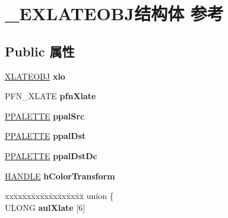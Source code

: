 \hypertarget{struct___e_x_l_a_t_e_o_b_j}{}\section{\+\_\+\+E\+X\+L\+A\+T\+E\+O\+B\+J结构体 参考}
\label{struct___e_x_l_a_t_e_o_b_j}
\subsection*{Public 属性}
\begin{DoxyCompactItemize}
\item 
\mbox{\label{struct___e_x_l_a_t_e_o_b_j_a0fdcb7720264e79ed574e84343294c29}} 
\hyperlink{struct___x_l_a_t_e_o_b_j}{X\+L\+A\+T\+E\+O\+BJ} {\bfseries xlo}
\item 
\mbox{\label{struct___e_x_l_a_t_e_o_b_j_a856ff64dacd2362e0ec90270f9d7d4a5}} 
P\+F\+N\+\_\+\+X\+L\+A\+TE {\bfseries pfn\+Xlate}
\item 
\mbox{\label{struct___e_x_l_a_t_e_o_b_j_a44d73539b3b0b87d65de88504a63ec1f}} 
\hyperlink{struct___p_a_l_e_t_t_e}{P\+P\+A\+L\+E\+T\+TE} {\bfseries ppal\+Src}
\item 
\mbox{\label{struct___e_x_l_a_t_e_o_b_j_a3f513f7eda818b321a307a2c508ecbe4}} 
\hyperlink{struct___p_a_l_e_t_t_e}{P\+P\+A\+L\+E\+T\+TE} {\bfseries ppal\+Dst}
\item 
\mbox{\label{struct___e_x_l_a_t_e_o_b_j_a97e562b980578c8646bb393374e61377}} 
\hyperlink{struct___p_a_l_e_t_t_e}{P\+P\+A\+L\+E\+T\+TE} {\bfseries ppal\+Dst\+Dc}
\item 
\mbox{\label{struct___e_x_l_a_t_e_o_b_j_a6a8001d7d1c7a1a62a440cfa75bf3120}} 
\hyperlink{interfacevoid}{H\+A\+N\+D\+LE} {\bfseries h\+Color\+Transform}
\item 
\mbox{\label{struct___e_x_l_a_t_e_o_b_j_a39bbaf4175c79dc0d48d02b474203130}} 
\begin{tabbing}
xx\=xx\=xx\=xx\=xx\=xx\=xx\=xx\=xx\=\kill
union \{\\
\>ULONG {\bfseries aulXlate} \mbox{[}6\mbox{]}\\

\end{tabbing}
\end{DoxyCompactItemize}
